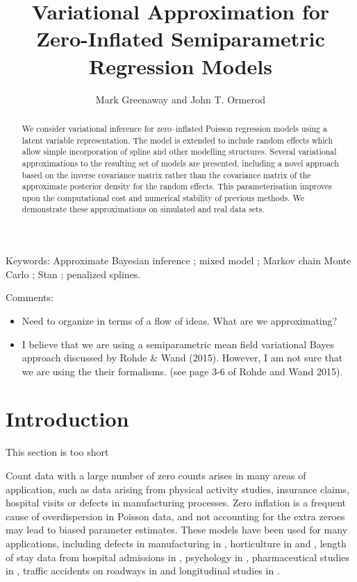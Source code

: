 \documentclass{amsart}[12pt]
\newcommand{\mgc}[1]{{\color{blue}#1}}
\newcommand{\joc}[1]{{\color{red}#1}}
\begin{document}
\title{Variational Approximation for Zero-Inflated Semiparametric Regression Models}
\author{Mark Greenaway and John T. Ormerod}

\begin{abstract}
	\noindent We consider variational inference for zero--inflated Poisson regression models using a latent
	variable representation. The model is extended to include random effects which allow simple incorporation of
	spline and other modelling structures. Several variational approximations to the resulting set of models are
	presented, including a novel approach based on the inverse covariance matrix rather than the covariance matrix
	of the approximate posterior density for the random effects. This parameterisation improves upon the
	computational cost and numerical stability of previous methods. We demonstrate these approximations on
	simulated and real data sets.
\end{abstract}
 
\maketitle

\noindent Keywords: Approximate Bayesian inference ; mixed model ; Markov chain Monte Carlo ; Stan ; penalized splines.

\joc{
	Comments: 
	\begin{itemize}
		\item Need to organize in terms of a flow of ideas. What are we approximating?
		      		      		      
		\item I believe that we are using a semiparametric mean field variational Bayes approach discussed by Rohde \& Wand (2015).
		      However, I am not sure that we are using the their formalisms. (see page 3-6 of Rohde and Wand 2015).
	\end{itemize}	
}

\section{Introduction}
\label{sec:introduction}

\mgc{This section is too short}

Count data with a large number of zero counts arises in many areas of application, such as data arising from
physical activity studies, insurance claims, hospital visits or defects in manufacturing processes. Zero
inflation is a frequent cause of overdispersion in Poisson data, and not accounting for the extra zeroes
may lead to biased parameter estimates. These models have been used for many applications, including defects
in manufacturing in \citep{lambert1992}, horticulture in \citep{BIOM:BIOM1030} and \citep{Hall2000}, length of
stay data from hospital admissions in \citep{BIMJ:BIMJ200390024}, psychology in \citep{JOFP:rethink},
pharmaceutical studies in \citep{Min01042005}, traffic accidents on roadways in \citep{Shankar1997829} and
longitudinal studies in \citep{LeeWangScottYauMcLachlan2006}.
\end{document}
